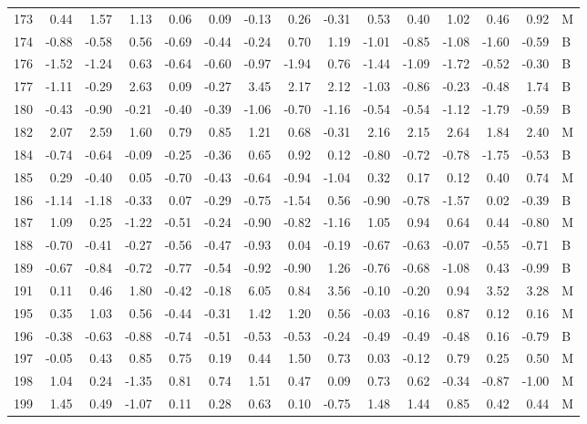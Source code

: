 \begin{table}[ht]
\begin{tabular}{rrrrrrrrrrrrrrl}
  173 & 0.44 & 1.57 & 1.13 & 0.06 & 0.09 & -0.13 & 0.26 & -0.31 & 0.53 & 0.40 & 1.02 & 0.46 & 0.92 & M \\ 
  174 & -0.88 & -0.58 & 0.56 & -0.69 & -0.44 & -0.24 & 0.70 & 1.19 & -1.01 & -0.85 & -1.08 & -1.60 & -0.59 & B \\ 
  176 & -1.52 & -1.24 & 0.63 & -0.64 & -0.60 & -0.97 & -1.94 & 0.76 & -1.44 & -1.09 & -1.72 & -0.52 & -0.30 & B \\ 
  177 & -1.11 & -0.29 & 2.63 & 0.09 & -0.27 & 3.45 & 2.17 & 2.12 & -1.03 & -0.86 & -0.23 & -0.48 & 1.74 & B \\ 
  180 & -0.43 & -0.90 & -0.21 & -0.40 & -0.39 & -1.06 & -0.70 & -1.16 & -0.54 & -0.54 & -1.12 & -1.79 & -0.59 & B \\ 
  182 & 2.07 & 2.59 & 1.60 & 0.79 & 0.85 & 1.21 & 0.68 & -0.31 & 2.16 & 2.15 & 2.64 & 1.84 & 2.40 & M \\ 
  184 & -0.74 & -0.64 & -0.09 & -0.25 & -0.36 & 0.65 & 0.92 & 0.12 & -0.80 & -0.72 & -0.78 & -1.75 & -0.53 & B \\ 
  185 & 0.29 & -0.40 & 0.05 & -0.70 & -0.43 & -0.64 & -0.94 & -1.04 & 0.32 & 0.17 & 0.12 & 0.40 & 0.74 & M \\ 
  186 & -1.14 & -1.18 & -0.33 & 0.07 & -0.29 & -0.75 & -1.54 & 0.56 & -0.90 & -0.78 & -1.57 & 0.02 & -0.39 & B \\ 
  187 & 1.09 & 0.25 & -1.22 & -0.51 & -0.24 & -0.90 & -0.82 & -1.16 & 1.05 & 0.94 & 0.64 & 0.44 & -0.80 & M \\ 
  188 & -0.70 & -0.41 & -0.27 & -0.56 & -0.47 & -0.93 & 0.04 & -0.19 & -0.67 & -0.63 & -0.07 & -0.55 & -0.71 & B \\ 
  189 & -0.67 & -0.84 & -0.72 & -0.77 & -0.54 & -0.92 & -0.90 & 1.26 & -0.76 & -0.68 & -1.08 & 0.43 & -0.99 & B \\ 
  191 & 0.11 & 0.46 & 1.80 & -0.42 & -0.18 & 6.05 & 0.84 & 3.56 & -0.10 & -0.20 & 0.94 & 3.52 & 3.28 & M \\ 
  195 & 0.35 & 1.03 & 0.56 & -0.44 & -0.31 & 1.42 & 1.20 & 0.56 & -0.03 & -0.16 & 0.87 & 0.12 & 0.16 & M \\ 
  196 & -0.38 & -0.63 & -0.88 & -0.74 & -0.51 & -0.53 & -0.53 & -0.24 & -0.49 & -0.49 & -0.48 & 0.16 & -0.79 & B \\ 
  197 & -0.05 & 0.43 & 0.85 & 0.75 & 0.19 & 0.44 & 1.50 & 0.73 & 0.03 & -0.12 & 0.79 & 0.25 & 0.50 & M \\ 
  198 & 1.04 & 0.24 & -1.35 & 0.81 & 0.74 & 1.51 & 0.47 & 0.09 & 0.73 & 0.62 & -0.34 & -0.87 & -1.00 & M \\ 
  199 & 1.45 & 0.49 & -1.07 & 0.11 & 0.28 & 0.63 & 0.10 & -0.75 & 1.48 & 1.44 & 0.85 & 0.42 & 0.44 & M \\ 

\end{tabular}
\end{table}
